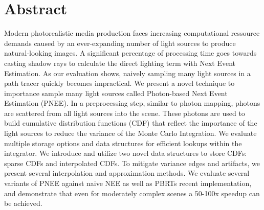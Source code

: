 \chapter*{Abstract}

Modern photorealistic media production faces increasing computational ressource demands caused by an ever-expanding number of light sources to produce natural-looking images. A significant percentage of processing time goes towards casting shadow rays to calculate the direct lighting term with Next Event Estimation. As our evaluation shows, naively sampling many light sources in a path tracer quickly becomes impractical. We present a novel technique to importance sample many light sources called Photon-based Next Event Estimation (PNEE). In a preprocessing step,  similar to photon mapping, photons are scattered from all light sources into the scene. These photons are used to build cumulative distribution functions (CDF) that reflect the importance of the light sources to reduce the variance of the Monte Carlo Integration. We evaluate multiple storage options and data structures for efficient lookups within the integrator. We introduce and utilize two novel data structures to store CDFs: sparse CDFs and interpolated CDFs. To mitigate variance edges and artifacts, we present several interpolation and approximation methods. We evaluate several variants of PNEE against naive NEE as well as PBRTs recent implementation, and demonstrate that even for moderately complex scenes a 50-100x speedup can be achieved.